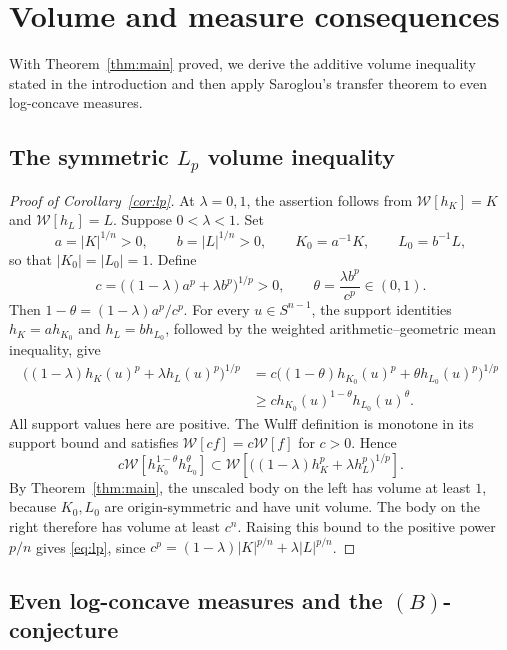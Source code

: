 \section{Volume and measure consequences}\label{sec:consequences}

With Theorem~\ref{thm:main} proved, we derive the additive volume
inequality stated in the introduction and then apply Saroglou's
transfer theorem to even log-concave measures.

\subsection{The symmetric \texorpdfstring{$L_p$}{Lp} volume inequality}
\label{subsec:lp-proof}

\begin{proof}[Proof of Corollary~\ref{cor:lp}]
At $\lambda=0,1$, the assertion follows from
$\mathcal W[h_K]=K$ and $\mathcal W[h_L]=L$. Suppose $0<\lambda<1$.
Set
\[
 a=|K|^{1/n}>0,\qquad b=|L|^{1/n}>0,\qquad
 K_0=a^{-1}K,\qquad L_0=b^{-1}L,
\]
so that $|K_0|=|L_0|=1$. Define
\[
 c=\bigl((1-\lambda)a^p+\lambda b^p\bigr)^{1/p}>0,
 \qquad \theta=\frac{\lambda b^p}{c^p}\in(0,1).
\]
Then $1-\theta=(1-\lambda)a^p/c^p$. For every $u\in S^{n-1}$,
the support identities $h_K=a h_{K_0}$ and $h_L=b h_{L_0}$, followed
by the weighted arithmetic--geometric mean inequality, give
\begin{align*}
 \bigl((1-\lambda)h_K(u)^p+\lambda h_L(u)^p\bigr)^{1/p}
 &=c\bigl((1-\theta)h_{K_0}(u)^p+
              \theta h_{L_0}(u)^p\bigr)^{1/p}\\
 &\ge c h_{K_0}(u)^{1-\theta}h_{L_0}(u)^\theta.
\end{align*}
All support values here are positive. The Wulff definition is monotone
in its support bound and satisfies $\mathcal W[cf]=c\mathcal W[f]$ for
$c>0$. Hence
\[
 c\mathcal W[h_{K_0}^{1-\theta}h_{L_0}^\theta]
 \subset
 \mathcal W\!\left[
  \bigl((1-\lambda)h_K^p+\lambda h_L^p\bigr)^{1/p}
 \right].
\]
By Theorem~\ref{thm:main}, the unscaled body on the left has volume at
least $1$, because $K_0,L_0$ are origin-symmetric and have unit volume.
The body on the right therefore has volume at least $c^n$. Raising this
bound to the positive power $p/n$ gives
\eqref{eq:lp}, since $c^p=(1-\lambda)|K|^{p/n}+\lambda|L|^{p/n}$.
\end{proof}

\subsection{Even log-concave measures and the \texorpdfstring{$(B)$}{(B)}-conjecture}
\label{sec:measure}

